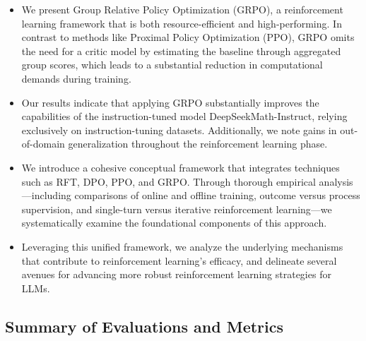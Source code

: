 \begin{itemize}[topsep=0pt]
    \item We present Group Relative Policy Optimization (GRPO), a reinforcement learning framework that is both resource-efficient and high-performing. In contrast to methods like Proximal Policy Optimization (PPO), GRPO omits the need for a critic model by estimating the baseline through aggregated group scores, which leads to a substantial reduction in computational demands during training.
    \item Our results indicate that applying GRPO substantially improves the capabilities of the instruction-tuned model DeepSeekMath-Instruct, relying exclusively on instruction-tuning datasets. Additionally, we note gains in out-of-domain generalization throughout the reinforcement learning phase.
    \item We introduce a cohesive conceptual framework that integrates techniques such as RFT, DPO, PPO, and GRPO. Through thorough empirical analysis—including comparisons of online and offline training, outcome versus process supervision, and single-turn versus iterative reinforcement learning—we systematically examine the foundational components of this approach.
    \item Leveraging this unified framework, we analyze the underlying mechanisms that contribute to reinforcement learning's efficacy, and delineate several avenues for advancing more robust reinforcement learning strategies for LLMs.
\end{itemize}

\subsection{Summary of Evaluations and Metrics}

